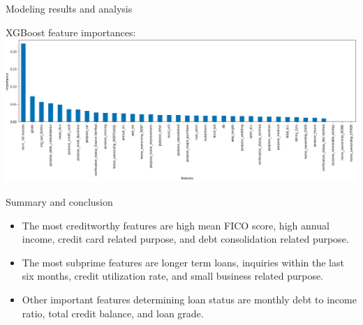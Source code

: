 \documentclass{beamer}
\begin{document}
\begin{frame}{Modeling results and analysis}
\begin{center}
XGBoost feature importances:
\includegraphics[scale=0.3]{xgboost-feature-importances}
\end{center}
\end{frame}

\begin{frame}{Summary and conclusion}
\begin{itemize}
\item The most creditworthy features are
high mean FICO score, high annual income, 
credit card related purpose, and debt consolidation related purpose.

\item The most subprime features are
longer term loans, inquiries within the last six months,
credit utilization rate, and small business related purpose.

\item Other important features determining loan status are monthly debt to
income ratio, total credit balance, and loan grade.
\end{itemize}
\end{frame}
\end{document}

